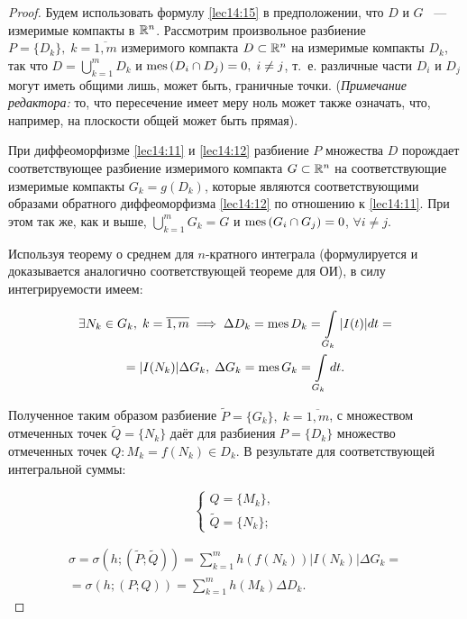 \documentclass[../../main.tex]{subfiles}
\begin{document}
	
	\begin{proof}
		
	Будем использовать формулу \eqref{lec14:15} в предположении, что
	$D$ и $G$ ~--- измеримые компакты в $\mathbb{R}^n$. Рассмотрим произвольное 
	разбиение $P =
	\{ D_k \},\; k = \overline{1, m}$ измеримого компакта $D \subset 
	\mathbb{R}^n$ на измеримые компакты $D_k$, так что $D = \bigcup\limits_{k = 1}^{m} 
	D_k$ 
	и $\operatorname{mes}\left(D_i \cap D_j\right) = 0,\; i \ne j$, т.~е. различные части $D_i$ 
	и 
	$D_j$ могут иметь общими лишь, может быть, граничные точки. (\emph{Примечание 
	редактора:} то, что пересечение имеет меру ноль может также означать, что, 
	например, на плоскости общей может быть прямая).
		   
	При диффеоморфизме \eqref{lec14:11} и \eqref{lec14:12} разбиение $P$ 
	множества $D$ порождает соответствующее разбиение измеримого компакта 
	$G \subset \mathbb{R}^n$ на соответствующие измеримые компакты
	$G_k = g(D_k)$, которые являются соответствующими образами обратного 
	диффеоморфизма 
	\eqref{lec14:12} по отношению к \eqref{lec14:11}. При этом так же, как и выше,
	$
	\bigcup\limits_{k = 1}^{m} G_k = G$ и $\operatorname{mes}\left(G_i \cap G_j\right) = 0$, 
	$\forall i \neq j$.
	
	Используя теорему о среднем для $n$-кратного интеграла (формулируется и 
	доказывается аналогично соответствующей теореме для ОИ), 
	в силу интегрируемости имеем:
	
	\[
	\begin{gathered}
	\exists N_k \in G_k,\; k = \overline{1, m} \implies \Delta D_k = \operatorname{mes} D_k 
	= \int\limits_{G_k} |I(t)| dt = \\ = |I(N_k)|
	 \Delta G_k,\; \Delta G_k = \operatorname{mes} G_k = \int\limits_{G_k} dt.
	\end{gathered}
	\]
	
	Полученное таким образом разбиение $\widetilde{P} = \{ G_k  \},\; 
	k = \overline{1, m}$, с множеством отмеченных точек $\widetilde{Q} = \{ N_k 
	\}$
	даёт для разбиения $P = \{D_k\}$ множество отмеченных точек $Q : M_k = 
	f(N_k) 
	\in D_k$. В результате для соответствующей интегральной суммы:
	
	\[
	\begin{cases}
	Q = \{ M_k \},\\
	\widetilde{Q} = \{ N_k \};
	\end{cases}
	\]
	
	\begin{equation}
	\label{lec15:40}
	\begin{gathered}
	\sigma = \sigma (h; (\widetilde{P}; \widetilde{Q}) ) = \sum_{k = 1}^{m} h 
	\left( f \left( N_k \right) \right)|I(N_k)| \Delta G_k = \\ = 
	\sigma ( h; \left( P; Q \right) ) = \sum_{k = 1}^{m} h 
	\left( M_k \right) \Delta D_k.
	\end{gathered}
	\end{equation}
	

\end{proof}
\end{document}
